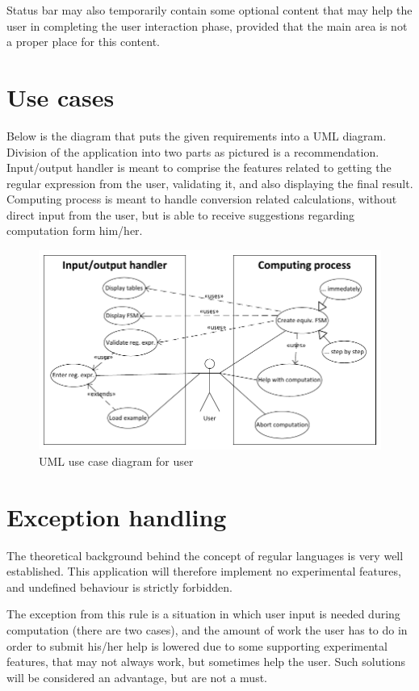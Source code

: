 \documentclass{article}
\begin{document}
Status bar may also temporarily contain some optional content that may help the user in completing
the user interaction phase, provided that the main area is not a proper place for this content.


\section{Use cases}

Below is the diagram that puts the given requirements into a UML diagram. Division of the
application into two parts as pictured is a recommendation. Input/output handler is meant to
comprise the features related to getting the regular expression from the user, validating it, and
also displaying the final result. Computing process is meant to handle conversion related
calculations, without direct input from the user, but is able to receive suggestions regarding
computation form him/her.

\begin{figure}[ht!]
  \centering
  \includegraphics[width=\textwidth]{../../use_case/use_cases.pdf}
  \caption{UML use case diagram for \titletext{} user}
\end{figure}

\section{Exception handling}
The theoretical background behind the concept of regular languages is very well established. This
application will therefore implement no experimental features, and undefined behaviour is strictly
forbidden.

The exception from this rule is a situation in which user input is needed during computation (there
are two cases), and the amount of work the user has to do in order to submit his/her help is lowered
due to some supporting experimental features, that may not always work, but sometimes help the user.
Such solutions will be considered an advantage, but are not a must.
\end{document}

